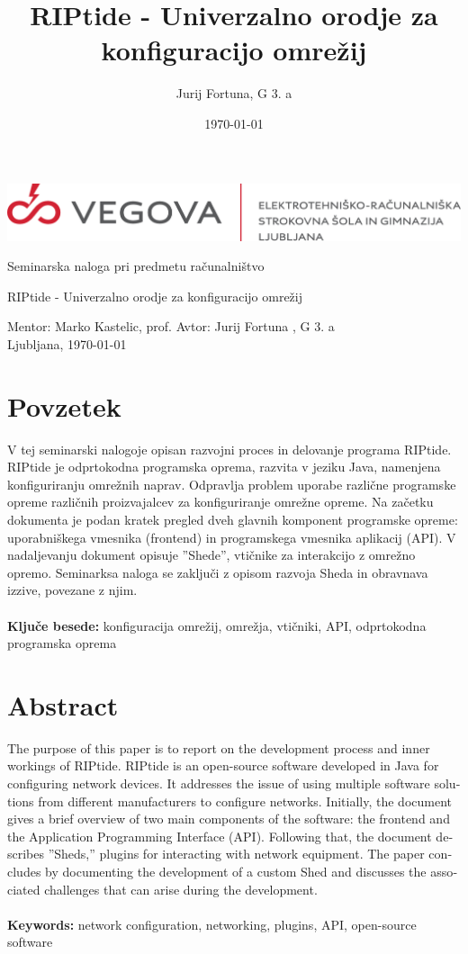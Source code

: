 \documentclass[12pt]{article}
\title{RIPtide - Univerzalno orodje za konfiguracijo omrežij}
\author{Jurij Fortuna, G 3. a}
\date{\MMYYYYdate\today}
\begin{document}
\begin{center}
	\thispagestyle{empty}
	\includegraphics[scale=1]{slike/vegova.png}

	\vspace{\fill}
	Seminarska naloga pri predmetu računalništvo

	\Huge{RIPtide - Univerzalno orodje za konfiguracijo omrežij}

	\normalsize
	\vspace{\fill}

	Mentor: Marko Kastelic, prof. \hfill Avtor: Jurij Fortuna , G 3. a\\
	\null
	Ljubljana, \MMYYYYdate\today
\end{center}
\newpage

\section*{Povzetek}
V tej seminarski nalogoje opisan razvojni proces in delovanje programa
RIPtide. RIPtide je odprtokodna programska oprema, razvita v jeziku Java,
namenjena konfiguriranju omrežnih naprav. Odpravlja problem uporabe
različne programske opreme različnih proizvajalcev za konfiguriranje
omrežne opreme. Na začetku dokumenta je podan kratek pregled dveh glavnih
komponent programske opreme: uporabniškega vmesnika (frontend) in
programskega vmesnika aplikacij (API). V nadaljevanju dokument opisuje
''Shede'', vtičnike za interakcijo z omrežno opremo. Seminarksa naloga se
zaključi z opisom razvoja Sheda in obravnava izzive, povezane z njim.
\\\\
\textbf{Ključe besede:} konfiguracija omrežij, omrežja, vtičniki, API,
odprtokodna programska oprema
\\
\section*{Abstract}
\foreignlanguage{english}{
	The purpose of this paper is to report on the development process and
	inner workings of RIPtide. RIPtide is an open-source software developed
	in Java for configuring network devices. It addresses the issue of
	using multiple software solutions from different manufacturers to
	configure networks. Initially, the document gives a brief overview of
	two main components of the software: the frontend and the Application
	Programming Interface (API). Following that, the document describes
	''Sheds,'' plugins for interacting with network equipment. The paper
	concludes by documenting the development of a custom Shed and discusses
	the associated challenges that can arise during the development.
	\\\\
	\textbf{Keywords:} network configuration, networking, plugins, API,
	open-source software
}
\newpage
\end{document}
